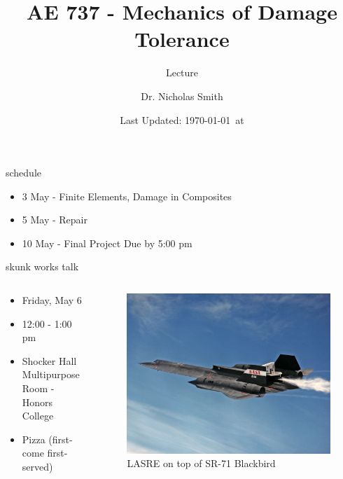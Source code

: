 \documentclass[10pt]{beamer}
\title{AE 737 - Mechanics of Damage Tolerance}
\subtitle{Lecture \arabic{lecture}}
\date{Last Updated: \today\ at \DTMcurrenttime}
\author{Dr. Nicholas Smith}
\institute{Wichita State University, Department of Aerospace Engineering}
\begin{document}
	
	\maketitle
	\begin{frame}{schedule}
		\begin{itemize}
			\item 3 May - Finite Elements, Damage in Composites
			\item 5 May - Repair
			\item 10 May - Final Project Due by 5:00 pm
		\end{itemize}
	\end{frame}
	
	\begin{frame}{skunk works talk}
		\begin{columns}
			\begin{column}{0.45\linewidth}
			\begin{itemize}
				\item Friday, May 6
				\item 12:00 - 1:00 pm
				\item Shocker Hall Multipurpose Room - Honors College
				\item Pizza (first-come first-served)
			\end{itemize}
			\end{column}
			\begin{column}{0.45\linewidth}
				\begin{figure}
				\centering
				\includegraphics[width=0.7\linewidth]{../Figures/SR-71_LASRE_cold_test}
				\caption{LASRE on top of SR-71 Blackbird}
				\label{fig:SR-71_LASRE_cold_test}
				\end{figure}
			\end{column}
		\end{columns}
	\end{frame}
	
\end{document}
